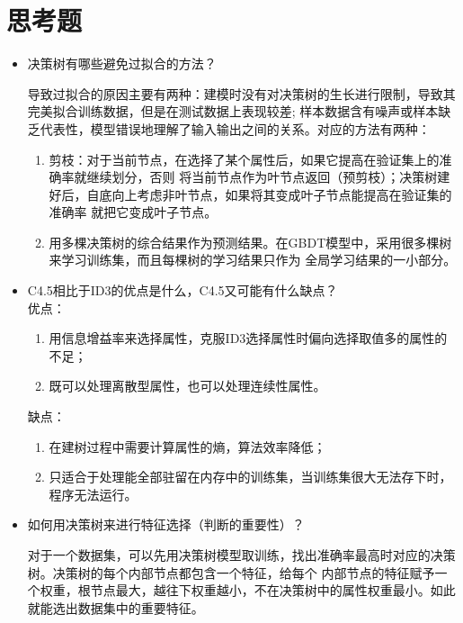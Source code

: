\documentclass[UTF8,a4paper,12pt]{article}
\begin{document}
\section{思考题}
\begin{itemize}
  \item 决策树有哪些避免过拟合的方法？
  \par \qquad 导致过拟合的原因主要有两种：建模时没有对决策树的生长进行限制，导致其完美拟合训练数据，但是在测试数据上表现较差;
  样本数据含有噪声或样本缺乏代表性，模型错误地理解了输入输出之间的关系。对应的方法有两种：
  \begin{enumerate}[itemindent=0.5em,label=(\arabic*)]
    \item 剪枝：对于当前节点，在选择了某个属性后，如果它提高在验证集上的准确率就继续划分，否则
    将当前节点作为叶节点返回（预剪枝）；决策树建好后，自底向上考虑非叶节点，如果将其变成叶子节点能提高在验证集的准确率
    就把它变成叶子节点。
    \item 用多棵决策树的综合结果作为预测结果。在GBDT模型中，采用很多棵树来学习训练集，而且每棵树的学习结果只作为
    全局学习结果的一小部分。
  \end{enumerate}
  \item C4.5相比于ID3的优点是什么，C4.5又可能有什么缺点？\\
  优点：
  \begin{enumerate}
    \item 用信息增益率来选择属性，克服ID3选择属性时偏向选择取值多的属性的不足；
    \item 既可以处理离散型属性，也可以处理连续性属性。
  \end{enumerate}
  缺点：
  \begin{enumerate}
    \item 在建树过程中需要计算属性的熵，算法效率降低；
    \item 只适合于处理能全部驻留在内存中的训练集，当训练集很大无法存下时，程序无法运行。
  \end{enumerate}
  \item 如何用决策树来进行特征选择（判断的重要性）？
  \par \qquad 对于一个数据集，可以先用决策树模型取训练，找出准确率最高时对应的决策树。决策树的每个内部节点都包含一个特征，给每个
  内部节点的特征赋予一个权重，根节点最大，越往下权重越小，不在决策树中的属性权重最小。如此就能选出数据集中的重要特征。
\end{itemize}
\end{document}
